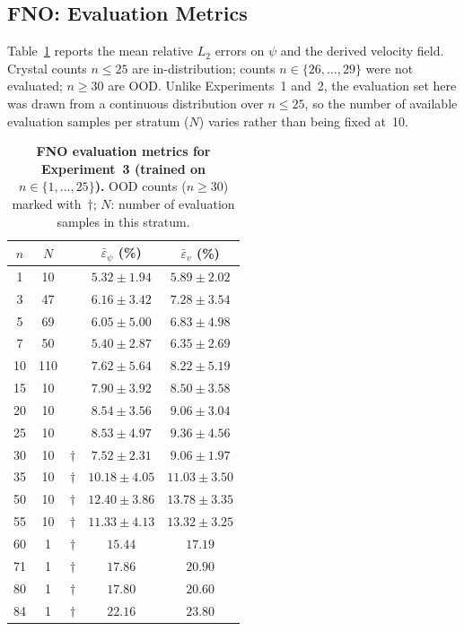 \subsection{FNO: Evaluation Metrics}
\label{ssec:results:exp3:fno:metrics}

Table~\ref{tab:fno_metrics_exp3} reports the mean relative $L_2$ errors on $\psi$ and the derived velocity field. Crystal counts $n \leq 25$ are in-distribution; counts $n \in \{26,\ldots,29\}$ were not evaluated; $n \geq 30$ are OOD. Unlike Experiments~1 and~2, the evaluation set here was drawn from a continuous distribution over $n \leq 25$, so the number of available evaluation samples per stratum ($N$) varies rather than being fixed at~10.

\begin{table}[htbp]
\centering
\caption{\textbf{FNO evaluation metrics for Experiment~3 (trained on $n \in \{1,\ldots,25\}$).}
         OOD counts ($n \geq 30$) marked with~$\dagger$; $N$: number of evaluation samples in this stratum.}
\label{tab:fno_metrics_exp3}
\begin{tabular}{ccccc}
\toprule
$n$ & $N$ & & $\bar{\varepsilon}_\psi$ (\%) & $\bar{\varepsilon}_v$ (\%) \\
\midrule
1  & 10  & & $5.32 \pm 1.94$ & $5.89 \pm 2.02$ \\
3  & 47  & & $6.16 \pm 3.42$ & $7.28 \pm 3.54$ \\
5  & 69  & & $6.05 \pm 5.00$ & $6.83 \pm 4.98$ \\
7  & 50  & & $5.40 \pm 2.87$ & $6.35 \pm 2.69$ \\
10 & 110 & & $7.62 \pm 5.64$ & $8.22 \pm 5.19$ \\
15 & 10  & & $7.90 \pm 3.92$ & $8.50 \pm 3.58$ \\
20 & 10  & & $8.54 \pm 3.56$ & $9.06 \pm 3.04$ \\
25 & 10  & & $8.53 \pm 4.97$ & $9.36 \pm 4.56$ \\
\midrule
30 & 10 & $\dagger$ & $7.52 \pm 2.31$  & $9.06 \pm 1.97$ \\
35 & 10 & $\dagger$ & $10.18 \pm 4.05$ & $11.03 \pm 3.50$ \\
50 & 10 & $\dagger$ & $12.40 \pm 3.86$ & $13.78 \pm 3.35$ \\
55 & 10 & $\dagger$ & $11.33 \pm 4.13$ & $13.32 \pm 3.25$ \\
60 &  1 & $\dagger$ & $15.44$          & $17.19$         \\
71 &  1 & $\dagger$ & $17.86$          & $20.90$         \\
80 &  1 & $\dagger$ & $17.80$          & $20.60$         \\
84 &  1 & $\dagger$ & $22.16$          & $23.80$         \\
\bottomrule
\end{tabular}
\end{table}

